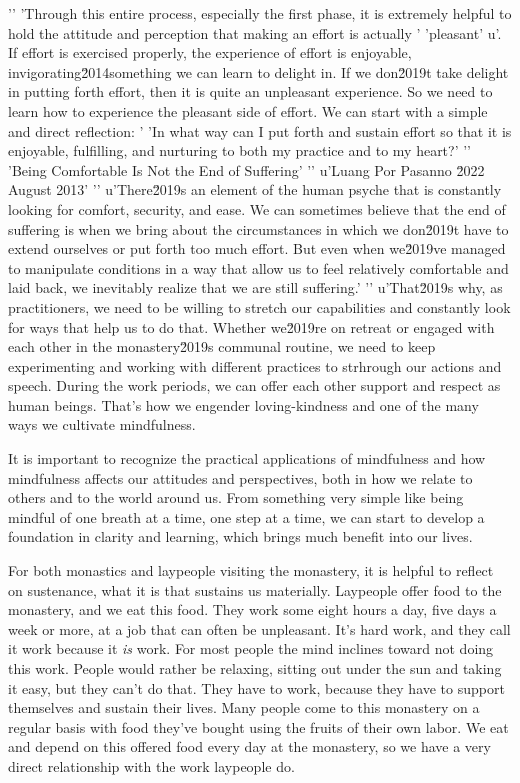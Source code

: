 '\n'
'Through this entire process, especially the first phase, it is extremely helpful to hold the attitude and perception that making an effort is actually '
'pleasant'
u'. If effort is exercised properly, the experience of effort is enjoyable, invigorating\u2014something we can learn to delight in. If we don\u2019t take delight in putting forth effort, then it is quite an unpleasant experience. So we need to learn how to experience the pleasant side of effort. We can start with a simple and direct reflection: '
'In what way can I put forth and sustain effort so that it is enjoyable, fulfilling, and nurturing to both my practice and to my heart?'
'\n'
'Being Comfortable Is Not the End of Suffering'
'\n'
u'Luang Por Pasanno \u2022 August 2013'
'\n'
u'There\u2019s an element of the human psyche that is constantly looking for comfort, security, and ease. We can sometimes believe that the end of suffering is when we bring about the circumstances in which we don\u2019t have to extend ourselves or put forth too much effort. But even when we\u2019ve managed to manipulate conditions in a way that allow us to feel relatively comfortable and laid back, we inevitably realize that we are still suffering.'
'\n'
u'That\u2019s why, as practitioners, we need to be willing to stretch our capabilities and constantly look for ways that help us to do that. Whether we\u2019re on retreat or engaged with each other in the monastery\u2019s communal routine, we need to keep experimenting and working with different practices to strhrough our actions and speech. During the work periods, we 
can offer each other support and respect as human beings. That's how we 
engender loving-kindness and one of the many ways we cultivate 
mindfulness.

It is important to recognize the practical applications of mindfulness 
and how mindfulness affects our attitudes and perspectives, both in how 
we relate to others and to the world around us. From something very 
simple like being mindful of one breath at a time, one step at a time, 
we can start to develop a foundation in clarity and learning, which 
brings much benefit into our lives.


For both monastics and laypeople visiting the monastery, it is helpful 
to reflect on sustenance, what it is that sustains us materially. 
Laypeople offer food to the monastery, and we eat this food. They work 
some eight hours a day, five days a week or more, at a job that can 
often be unpleasant. It's hard work, and they call it work because it 
\emph{is} work. For most people the mind inclines toward not doing this 
work. People would rather be relaxing, sitting out under the sun and 
taking it easy, but they can't do that. They have to work, because they 
have to support themselves and sustain their lives. Many people come to 
this monastery on a regular basis with food they've bought using the 
fruits of their own labor. We eat and depend on this offered food every 
day at the monastery, so we have a very direct relationship with the 
work laypeople do.

